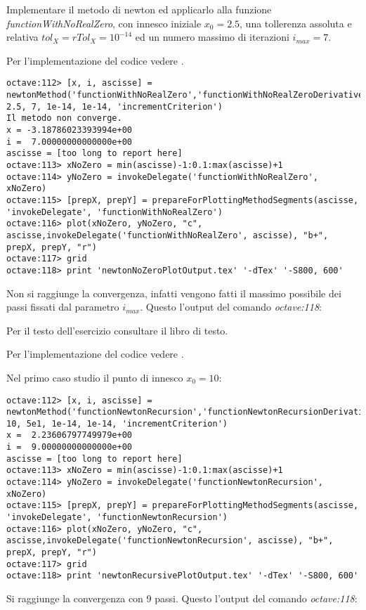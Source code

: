 \begin{exercise}
Implementare il metodo di newton ed applicarlo alla funzione \emph{functionWithNoRealZero},
con innesco iniziale $x_{0} = 2.5$, una tollerenza assoluta e relativa
$tol_{X} = rTol_{X} = 10^{-14}$ ed un numero massimo di iterazioni
$i_{max} = 7$.
\end{exercise}
Per l'implementazione del codice vedere .
\begin{lstlisting}
octave:112> [x, i, ascisse] =
newtonMethod('functionWithNoRealZero','functionWithNoRealZeroDerivative', 2.5, 7, 1e-14, 1e-14, 'incrementCriterion') 
Il metodo non converge.
x = -3.18786023393994e+00
i =  7.00000000000000e+00
ascisse = [too long to report here]
octave:113> xNoZero = min(ascisse)-1:0.1:max(ascisse)+1
octave:114> yNoZero = invokeDelegate('functionWithNoRealZero', xNoZero)
octave:115> [prepX, prepY] = prepareForPlottingMethodSegments(ascisse, 'invokeDelegate', 'functionWithNoRealZero')
octave:116> plot(xNoZero, yNoZero, "c", ascisse,invokeDelegate('functionWithNoRealZero', ascisse), "b+", prepX, prepY, "r")
octave:117> grid
octave:118> print 'newtonNoZeroPlotOutput.tex' '-dTex' '-S800, 600'
\end{lstlisting}
Non si raggiunge la convergenza, infatti vengono fatti il massimo possibile
dei passi fissati dal parametro $i_{max}$. Questo l'output del comando \emph{octave:118}:
\begin{center}

\end{center}

\begin{exercise}[2.4]
\label{exercise:newtonLoopStartingPoint}
Per il testo dell'esercizio consultare il libro di testo.
\end{exercise}
Per l'implementazione del codice vedere .

Nel primo caso studio il punto di innesco $x_{0} = 10$:
\begin{lstlisting}
octave:112> [x, i, ascisse] =
newtonMethod('functionNewtonRecursion','functionNewtonRecursionDerivative', 10, 5e1, 1e-14, 1e-14, 'incrementCriterion') 
x =  2.23606797749979e+00
i =  9.00000000000000e+00
ascisse = [too long to report here]
octave:113> xNoZero = min(ascisse)-1:0.1:max(ascisse)+1
octave:114> yNoZero = invokeDelegate('functionNewtonRecursion', xNoZero)
octave:115> [prepX, prepY] = prepareForPlottingMethodSegments(ascisse, 'invokeDelegate', 'functionNewtonRecursion')
octave:116> plot(xNoZero, yNoZero, "c", ascisse,invokeDelegate('functionNewtonRecursion', ascisse), "b+", prepX, prepY, "r")
octave:117> grid
octave:118> print 'newtonRecursivePlotOutput.tex' '-dTex' '-S800, 600'
\end{lstlisting}
Si raggiunge la convergenza con 9 passi. Questo l'output del comando
\emph{octave:118}:
\begin{center}

\end{center}

